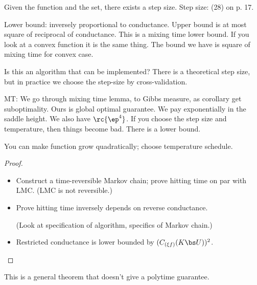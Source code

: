 Given the function and the set, there exists a step size. Step size: (28) on p. 17.

%
Lower bound: inversely proportional to conductance. Upper bound is at most square of reciprocal of conductance. %
This is a mixing time lower bound. If you look at a convex function it is the same thing.
The bound we have is square of mixing time for convex case.

Is this an algorithm that can be implemented? There is a theoretical step size, but in practice we choose the step-size by cross-validation. 






MT: We go through mixing time lemma, to Gibbs measure, as corollary get suboptimality. Ours is global optimal guarantee. We pay exponentially in the saddle height. We also have $\rc{\ep^4}$. If you choose the step size and temperature, then things become bad. There is a lower bound.

You can make function grow quadratically; choose temperature schedule. 
\begin{proof}
\begin{itemize}
\item
Construct a time-reversible Markov chain; prove hitting time on par with LMC. (LMC is not reversible.)
\item
Prove hitting time inversely depends on reverse conductance.

(Look at specification of algorithm, specifics of Markov chain.)
\item
Restricted conductance is lower bounded by $(C_{(\xi f)}(K\bs U))^2$. 
\end{itemize}
\end{proof}
This is a general theorem that doesn't give a polytime guarantee.


